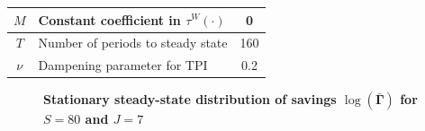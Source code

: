 \begin{spacing}{1.5}
\begin{table}[htbp]
\begin{threeparttable}
\begin{tabular}{>{\footnotesize}c |>{\footnotesize}l |>{\footnotesize}c}
        $M$ & Constant coefficient in $\tau^W(\cdot)$ & 0 \\
        \hline
        $T$ & Number of periods to steady state & 160 \\
        $\nu$ & Dampening parameter for TPI & 0.2 \\
        \hline\hline
      \end{tabular}
      \end{threeparttable}
    \end{table}

    \begin{figure}[htb]\centering \captionsetup{width=4.0in}
      \caption{\label{FigLogSavSS}\textbf{Stationary steady-state distribution of savings $\log(\bar{\bm{\Gamma}})$ for $S=80$ and $J=7$}}
    \end{figure}


\end{spacing}
